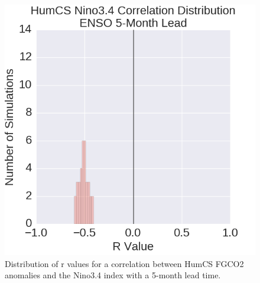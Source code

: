 \documentclass[12pt]{article}
\begin{document}
\newpage
\begin{figure}[!h]
	\centering
	\includegraphics[width=29pc]{../../figs/humcs/histograms/humcs-smoothedFGCO2-enso-lag5-histograms.png}
	\caption{Distribution of r values for a correlation between HumCS FGCO2 anomalies and the Nino3.4 index with a 5-month lead time.}
	\label{fig:HumCS-ENSO-hist-5lag}
\end{figure}
\end{document}
